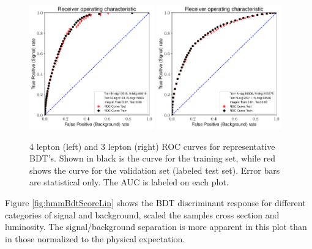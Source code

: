 \begin{figure}[htpb]
  \centering
  \includegraphics[width=0.48\textwidth]{figures/hmm/bdtHist/roc-4lep-ZH-AllBackground-0-depth2-nEst80tag-new-AllBackground.pdf}
  \includegraphics[width=0.48\textwidth]{figures/hmm/bdtHist/roc-3lep-WH-AllBackground-0-depth2-nEst50tag-new-AllBackground.pdf}
  \caption{4 lepton (left) and 3 lepton (right) ROC curves for representative BDT's. Shown in black is the curve for the training set, while red shows the curve for the validation set (labeled test set). Error bars are statistical only. The AUC is labeled on each plot.}
    \label{fig:hmmBdtRoc}
\end{figure}

Figure \ref{fig:hmmBdtScoreLin} shows the BDT discriminant response for different categories of signal and background, scaled the samples cross section and luminosity. The signal/background separation is more apparent in this plot than in those normalized to the physical expectation.


